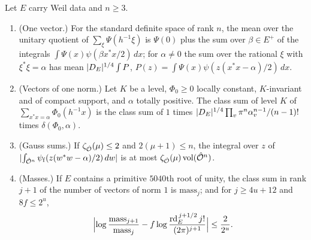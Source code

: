 \begin{theorem}\label{thm:B-siegel-formula}
Let $E$ carry Weil data and $n\ge3$.
\begin{enumerate}[label=\textup{(\alph*)}]
\item (One vector.) For the standard definite space of rank $n$, the mean over the unitary quotient of $\sum_\xi\Psi(h^{-1}\xi)$ is $\Psi(0)$ plus the sum over $\beta\in E^+$ of the integrals
$\int\Psi(x)\psi(\beta x^*x/2)\,dx$; for $\alpha\ne0$ the sum over the rational $\xi$ with $\xi^*\xi=\alpha$ has mean $\lvert D_E\rvert^{1/4}\int P$, $P(z)=\int\Psi(x)\psi(z(x^*x-\alpha)/2)\,dx$.
\item (Vectors of one norm.) Let $K$ be a level, $\Phi_0\ge0$ locally constant, $K$-invariant and of compact support, and $\alpha$ totally positive. The class sum of level $K$ of
$\sum_{x^*x=\alpha}\Phi_0(h^{-1}x)$ is the class sum of $1$ times $\lvert D_E\rvert^{1/4}\prod_v\pi^n\alpha_v^{n-1}/(n-1)!$ times $\delta(\Phi_0,\alpha)$.
\item (Gauss sums.) If $\zeta_{\hat{\mathcal{O}}}(\mu)\le2$ and $2(\mu+1)\le n$, the integral over $z$ of $\lvert \int_{\hat{\mathcal{O}}^n}\psi_{\rm f}(z(w^*w-\alpha)/2)\,dw\rvert$ is at most $\zeta_{\hat{\mathcal{O}}}(\mu)\operatorname{vol}(\hat{\mathcal{O}}^n)$.
\item (Masses.) If $E$ contains a primitive $5040$th root of unity, the class sum in rank $j+1$ of the number of vectors of norm $1$ is $\mathrm{mass}_j$; and for $j\ge4u+12$ and $8f\le2^u$,
\[
  \Bigl|\log\frac{\mathrm{mass}_{j+1}}{\mathrm{mass}_j}-f\log\frac{\mathrm{rd}_E^{\,j+1/2}\,j!}{(2\pi)^{j+1}}\Bigr|\le\frac2{2^u}.
\]
\end{enumerate}
\end{theorem}

